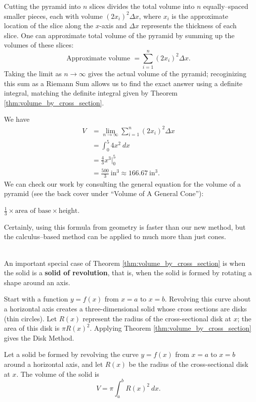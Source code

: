 {Cutting the pyramid into $n$ slices divides the total volume into $n$ equally--spaced smaller pieces, each with volume $(2x_i)^2\Delta x$, where $x_i$ is the approximate location of the slice along the $x$-axis and $\Delta x$ represents the thickness of each slice. One can approximate total volume of the pyramid by summing up the volumes of these slices:
$$\text{Approximate volume } = \sum_{i=1}^n (2x_i)^2\Delta x.$$
Taking the limit as $n\to\infty$ gives the actual volume of the pyramid; recoginizing this sum as a Riemann Sum allows us to find the exact answer using a definite integral, matching the definite integral given by Theorem \ref{thm:volume_by_cross_section}.

We have 
\begin{align*} V &= \lim_{n\to\infty} \sum_{i=1}^n (2x_i)^2\Delta x\\
							&= \int_0^5 4x^2\ dx\\
				&= \frac43x^3\Big|_0^5 \\
				&=\frac{500}{3}\ \text{in}^3 \approx 166.67\ \text{in}^3.
\end{align*}
We can check our work by consulting the general equation for the volume of a pyramid (see the back cover under ``Volume of A General Cone''): 

\hfill $\frac13\times \text{area of base}\times \text{height}$.\hfill \null

\noindent Certainly, using this formula from geometry is faster than our new method, but the calculus--based method can be applied to much more than just cones.
}\\

An important special case of Theorem \ref{thm:volume_by_cross_section} is when the solid is a \textbf{solid of revolution}, that is, when the solid is formed by rotating a shape around an axis.

Start with a function $y=f(x)$ from $x=a$ to $x=b$. Revolving this curve about a horizontal axis creates a three-dimensional solid whose cross sections are disks (thin circles). Let $R(x)$ represent the radius of the cross-sectional disk at $x$; the area of this disk is $\pi R(x)^2$. Applying Theorem \ref{thm:volume_by_cross_section} gives the Disk Method.

{Let a solid be formed by revolving the curve $y=f(x)$ from $x=a$ to $x=b$ around a horizontal axis, and let $R(x)$ be the radius of the cross-sectional disk at $x$. The volume of the solid is
$$V = \pi \int_a^b R(x)^2\ dx.$$
}

